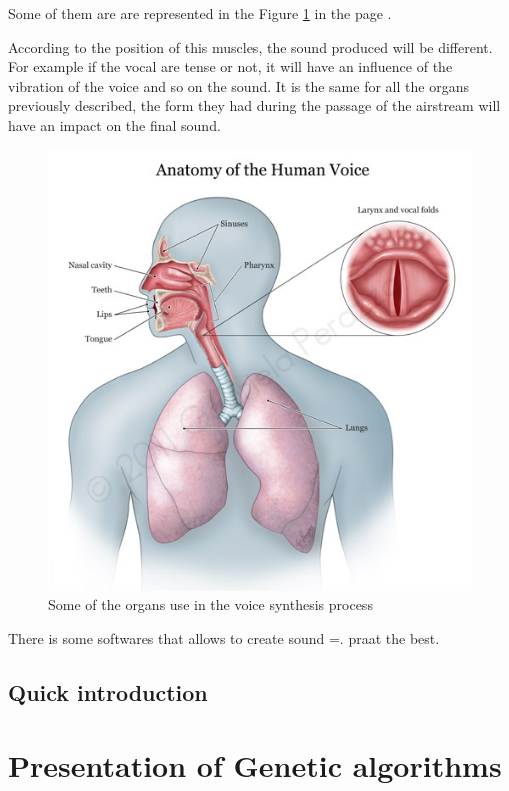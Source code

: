 \documentclass[12pt]{report}
\begin{document}
Some of them are are represented in the Figure \ref{ImageHumanVoice} in the page \pageref{ImageHumanVoice}.


According to the position of this muscles, the sound produced will be different. For example if the vocal are tense or not, it will have an influence of the vibration of the voice and so on the sound. It is the same for all the organs previously described, the form they had during the passage of the airstream will have an impact on the final sound.

\begin{figure}
\begin{center}
\includegraphics[scale=0.5]{human_voice.jpg} 
\end{center}
\caption{Some of the organs use in the voice synthesis process}
\label{ImageHumanVoice}
\end{figure}

There is some softwares that allows to create sound =. praat the best.

\section{Quick introduction}

\chapter{Presentation of Genetic algorithms}
\end{document}
